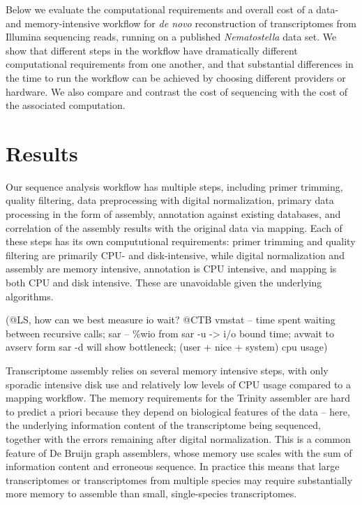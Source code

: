 Below we evaluate the computational requirements and overall cost of a
data- and memory-intensive workflow for {\em de novo} reconstruction
of transcriptomes from Illumina sequencing reads, running on a
published {\em Nematostella} data set.  We show that different steps
in the workflow have dramatically different computational requirements
from one another, and that substantial differences in the time to run
the workflow can be achieved by choosing different providers or hardware.
We also compare and contrast the cost of sequencing with the cost of the
associated computation.


\section*{Results}

Our sequence analysis workflow has multiple steps, including primer
trimming, quality filtering, data preprocessing with digital
normalization, primary data processing in the form of assembly,
annotation against existing databases, and correlation of the assembly
results with the original data via mapping.  Each of these steps has
its own compututional requirements: primer trimming and quality
filtering are primarily CPU- and disk-intensive, while digital
normalization and assembly are memory intensive, annotation is CPU
intensive, and mapping is both CPU and disk intensive.  These are
unavoidable given the underlying algorithms.

(@LS, how can we best measure io wait?
@CTB vmstat -- time spent waiting between recursive calls; 
sar -- 	\%wio from sar -u -> i/o bound time;  
avwait to avserv form sar -d will show bottleneck;
 (user + nice + system) cpu usage)

Transcriptome assembly relies on several memory intensive steps, with
only sporadic intensive disk use and relatively low levels of CPU
usage compared to a mapping workflow.  The memory requirements for the
Trinity assembler are hard to predict a priori because they depend on
biological features of the data -- here, the underlying information
content of the transcriptome being sequenced, together with the errors
remaining after digital normalization.  This is a common feature of De
Bruijn graph assemblers, whose memory use scales with the sum of
information content and erroneous sequence.  In practice this means
that large transcriptomes or transcriptomes from multiple species may
require substantially more memory to assemble than small,
single-species transcriptomes.

